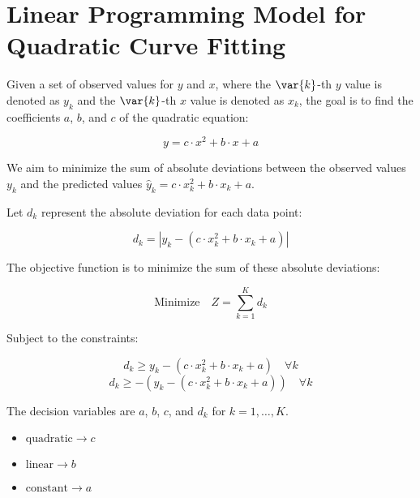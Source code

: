 \documentclass{article}
\begin{document}
\section*{Linear Programming Model for Quadratic Curve Fitting}

Given a set of observed values for \( y \) and \( x \), where the \(\var{k}\)-th \( y \) value is denoted as \( y_k \) and the \(\var{k}\)-th \( x \) value is denoted as \( x_k \), the goal is to find the coefficients \( a \), \( b \), and \( c \) of the quadratic equation:

\[
y = c \cdot x^2 + b \cdot x + a
\]

We aim to minimize the sum of absolute deviations between the observed values \( y_k \) and the predicted values \( \hat{y}_k = c \cdot x_k^2 + b \cdot x_k + a \). 

Let \( d_k \) represent the absolute deviation for each data point:

\[
d_k = |y_k - (c \cdot x_k^2 + b \cdot x_k + a)|
\]

The objective function is to minimize the sum of these absolute deviations:

\[
\text{Minimize} \quad Z = \sum_{k=1}^{K} d_k
\]

Subject to the constraints:

\[
d_k \geq y_k - (c \cdot x_k^2 + b \cdot x_k + a) \quad \forall k
\]
\[
d_k \geq -(y_k - (c \cdot x_k^2 + b \cdot x_k + a)) \quad \forall k
\]

The decision variables are \( a \), \( b \), \( c \), and \( d_k \) for \( k = 1, \ldots, K \).

\begin{itemize}
    \item \( \text{quadratic} \longrightarrow c \)
    \item \( \text{linear} \longrightarrow b \)
    \item \( \text{constant} \longrightarrow a \)
\end{itemize}
\end{document}
